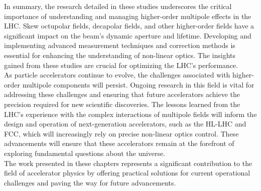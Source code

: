 {%
In summary, the research detailed in these studies underscores the critical importance of
understanding and managing higher-order multipole effects in the LHC. Skew octupolar fields,
decapolar fields, and other higher-order fields have a significant impact on the beam's dynamic
aperture and lifetime. Developing and implementing advanced measurement techniques and correction
methods is essential for enhancing the understanding of non-linear optics. The insights gained from
these studies are crucial for optimizing the LHC's performance.
\\
\indent
As particle accelerators continue to evolve, the challenges associated with higher-order multipole
components will persist. Ongoing research in this field is vital for addressing these challenges and
ensuring that future accelerators achieve the precision required for new scientific discoveries. The
lessons learned from the LHC's experience with the complex interactions of multipole fields will
inform the design and operation of next-generation accelerators, such as the HL-LHC and FCC, which
will increasingly rely on precise non-linear optics control. These advancements will ensure that
these accelerators remain at the forefront of exploring fundamental questions about the universe.
\\
\indent
The work presented in these chapters represents a significant contribution to the field of
accelerator physics by offering practical solutions for current operational challenges and paving
the way for future advancements.

} %


\chapter{}

